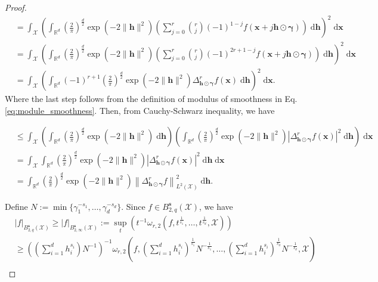 \documentclass[11pt]{article}
\newcommand{\bgamma}{\boldsymbol{\gamma}}
\newcommand{\bx}{\mathbf x}
\newcommand{\calX}{\mathcal{X}}
\newcommand{\x}{\mathbf{x}}
\newcommand{\R}{\mathbb{R}}
\newcommand{\0}{\mathbf{0}}
\newcommand{\bh}{\boldsymbol{h}}
\newcommand{\bs}{\boldsymbol{s}}
\begin{document}
\begin{appendix}
\begin{proof}
\begin{align*}
    &= \int_{\calX} \left( \int_{\R^d}\left(\frac{2}{\pi}\right)^{\frac{d}{2}} \exp\left( -2 \| \bh\|^2 \right) \left(\sum_{j=0}^r \binom{r}{j}(-1)^{1-j} f( \x + j \bh \odot \bgamma )\right) \;\mathrm{d}\bh \right)^2 \;\mathrm{d}\bx \\
    &= \int_\calX \left( \int_{\R^d}\left(\frac{2}{\pi}\right)^{\frac{d}{2}} \exp\left( -2 \| \bh\|^2 \right) \left(\sum_{j=0}^r \binom{r}{j}(-1)^{2r + 1 - j} f( \x + j \bh \odot \bgamma )\right) \;\mathrm{d}\bh \right)^2 \;\mathrm{d}\bx \\
    &= \int_\calX \left( \int_{\R^d} (-1)^{r+1} \left(\frac{2}{\pi}\right)^{\frac{d}{2}} \exp\left( -2 \| \bh\|^2 \right) \Delta_{\bh \odot \bgamma}^r f(\bx) \;\mathrm{d}\bh \right)^2 \;\mathrm{d}\bx .
\end{align*}
Where the last step follows from the definition of modulus of smoothness in Eq. \eqref{eq:module_smoothness}.
Then, from Cauchy-Schwarz inequality, we have
\begin{small}
\begin{align}\label{eq:K_gamma_f_f_diff_Delta}
    &\leq  \int_\calX \left( \int_{\R^d} \left(\frac{2}{\pi}\right)^{\frac{d}{2}} \exp\left( -2 \| \bh\|^2 \right) \;\mathrm{d}\bh\right) \left( \int_{\R^d} \left(\frac{2}{\pi}\right)^{\frac{d}{2}} \exp\left( -2 \| \bh\|^2 \right) \left| \Delta_{\bh \odot \bgamma}^r f(\bx) \right|^2 \;\mathrm{d}\bh \right) \;\mathrm{d}\bx \nonumber \\
    &= \int_\calX \int_{\R^d} \left(\frac{2}{\pi}\right)^{\frac{d}{2}} \exp\left( -2 \| \bh\|^2 \right) \left| \Delta_{\bh \odot \bgamma}^r f(\bx) \right|^2 \;\mathrm{d}\bh  \;\mathrm{d}\bx \nonumber \\
    &= \int_{\R^d} \left(\frac{2}{\pi}\right)^{\frac{d}{2}} \exp\left( -2 \| \bh\|^2 \right) \left\| \Delta_{\bh \odot \bgamma}^r f \right\|_{L^2(\calX)}^2  \;\mathrm{d}\bh .
\end{align}
\end{small}
Define $N := \min\{\gamma_1^{-s_1}, \ldots, \gamma_d^{-s_d}\}$.
Since $f \in B_{2,q}^{\bs}(\calX)$, 
we have
\begin{align*}
    &|f|_{B_{2,q}^{\bs}(\calX)} \geq |f|_{B_{2,\infty}^{\bs}(\calX)} := \sup_{t} \left( t^{-1} \omega_{r, 2} \left(f, t^{\frac{1}{s_1}}, \ldots, t^{\frac{1}{s_d}}, \calX \right) \right) \\
    &\geq \left( \left( \sum_{i=1}^d h_i^{s_i} \right) N^{-1} \right)^{-1} \omega_{r, 2} \left(f, \left( \sum_{i=1}^d h_i^{s_i} \right)^{\frac{1}{s_1}} N^{-\frac{1}{s_1}}, \ldots, \left( \sum_{i=1}^d h_i^{s_i} \right)^{\frac{1}{s_d}} N^{-\frac{1}{s_d}}, \calX \right) \\

\end{align*}
\end{proof}
\end{appendix}
\end{document}
